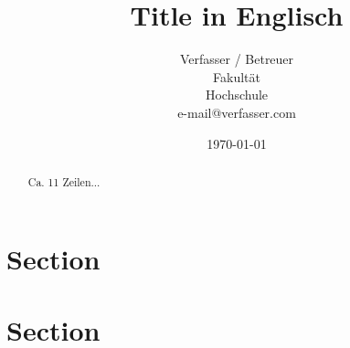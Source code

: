 \documentclass[11pt,a4paper]{article}
\begin{document}
\title{Title in Englisch} 
\date{\today}
\author{
    Verfasser / Betreuer \\
    Fakultät\\
    Hochschule\\
    e-mail@verfasser.com\\
    }
\maketitle

\begin{abstract}
Ca. 11 Zeilen... \\
\lipsum[1]
\end{abstract}
\vspace{15mm}
\thispagestyle{fancy}

\begin{multicols}{2}
\section{Section}
\lipsum[1-2]
\section{Section}
\lipsum[3-9]
\end{multicols}
\end{document}
